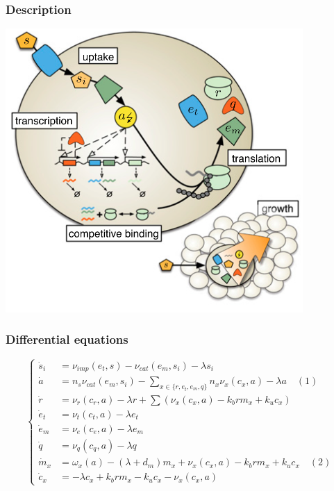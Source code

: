 \documentclass{beamer}
\begin{document}
\begin{frame}
\frametitle{Description}
\centering
\includegraphics[width=0.85\textwidth]{model.png}
\end{frame}

\begin{frame}
\frametitle{Differential equations}
$$
\begin{cases}
\dot{s}_i &= \nu_{imp}(e_t, s) - \nu_{cat}(e_m, s_i) -\lambda s_i \\
\dot{a} &= n_s \nu_{cat}(e_m, s_i) - \sum\limits_{x\in \{r, e_t, e_m, q\}}n_x \nu_x(c_x, a) - \lambda a \quad (1)\\
\dot{r} &= \nu_r(c_r, a) -\lambda r + \sum (\nu_x(c_x, a)- k_b r m_x + k_u c_x) \\
\dot{e}_t &= \nu_t(c_t, a) - \lambda e_t \\
\dot{e}_m &= \nu_e(c_e, a) - \lambda e_m \\
\dot{q} &= \nu_q(c_q, a) - \lambda q \\
\dot{m}_x &= \omega_x(a) - (\lambda + d_m)m_x + \nu_x(c_x, a)- k_b r m_x + k_u c_x \quad (2)\\
\dot{c}_x &= -\lambda c_x + k_b r m_x - k_u c_x - \nu_x(c_x, a)
\end{cases}
$$
\end{frame}
\end{document}
